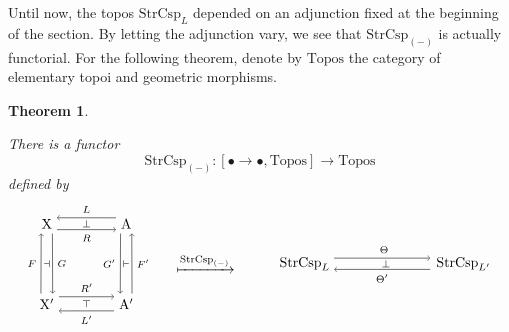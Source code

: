 \documentclass{amsart}
\newcommand{\A}{\cat{A}}
\newcommand{\X}{\cat{X}}
\newcommand{\Topos}{\cat{Topos}}
\newcommand{\StrCsp}{\cat{StrCsp}}
\newcommand{\cat}[1]{\mathrm{#1}}
\newcommand{\from}{\colon}
\newtheorem{theorem}{Theorem}[section]
\theoremstyle{remark}
\theoremstyle{definition}
\begin{document}
Until now, the topos $ \StrCsp_L $ depended on an adjunction fixed at
the beginning of the section.  By letting the adjunction vary, we see
that $ \StrCsp_{(-)} $ is actually functorial. For the following theorem, denote by $ \Topos $ the category of
elementary topoi and geometric morphisms.

\begin{theorem} \label{thm:strcsp-isfunctorial}

  There is a functor
  \[
    \StrCsp_{(-)} \from
    [ \bullet \to \bullet , \Topos ]
    \to
    \Topos
  \]
  defined by  
  \[
    \begin{tikzpicture}
      \begin{scope}
      \node (1) at (-1,1) {\( \X \)};
      \node (2) at (-1,-1) {\( \X' \)};
      \node (3) at (1,1) {\( \A \)};
      \node (4) at (1,-1) {\( \A' \)};
      \draw [->] (1.-60) to node [right] {\scriptsize{\( G \)}} (2.60);
      \draw [<-] (1.-120) to node [left] {\scriptsize{\( F \)}} (2.120);
      \draw [<-] (1.30) to node [above] {\scriptsize{\( L \)}} (3.150);  
      \draw [->] (1.-30) to node [below] {\scriptsize{\( R \)}} (3.-150);
      \draw [->] (2.30) to node [above] {\scriptsize{\( R' \)}} (4.150);
      \draw [<-] (2.-30) to node [below] {\scriptsize{\( L' \)}} (4.-150);      
      \draw [<-] (3.-60) to node [right] {\scriptsize{\( F' \)}} (4.60);
      \draw [->] (3.-120) to node [left] {\scriptsize{\( G' \)}}
      (4.120);
      \node (5) at (0,-1) {\scriptsize{\( \top \)}};
      \node (6) at (0,1) {\scriptsize{\( \perp \)}};
      \node (7) at (-1,0) {\scriptsize{\( \dashv \)}};
      \node (8) at (1,0) {\scriptsize{\( \vdash \)}};
      \end{scope}
      \begin{scope}[shift={(3,0)}]
      \node (1) at (0,0) { $\xmapsto{ \StrCsp_{(-)} }$ };
      \end{scope}
      \begin{scope}[shift={(5.5,0)}]
      \node (1) [inner sep=0.1cm] at (0,0) {\( \StrCsp_{L} \)};
      \node (2) [inner sep=0.15cm] at (4,0) {\( \StrCsp_{L'} \)};
      \node (3) at (2,0) {\scriptsize{ \( \perp \) }};
      \draw [->]
        ([yshift= 4pt]1.east) to
        node [above] {\scriptsize{ \( \Theta \) }}
        ([yshift= 4pt]2.west);
      \draw [->]
        ([yshift= -4pt]2.west) to
        node [below] {\scriptsize{ \( \Theta' \) } }
        ([yshift= -4pt]1.east);  
      \end{scope}
    \end{tikzpicture}
\]
\end{theorem}
\end{document}

